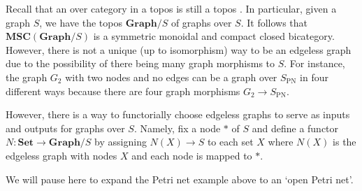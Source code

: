 \documentclass[11pt]{amsart}
\newcommand{\cat}[1]{\mathbf{#1}}
\newcommand{\from}{\colon}
\theoremstyle{remark}
\theoremstyle{definition}
\begin{document}
Recall that an over category in a topos is still a topos .  In particular, given a graph $S$, we have the topos $\cat{Graph}/S$ of graphs over $S$. It follows that $\cat{MSC}(\cat{Graph}/S)$ is a symmetric monoidal and compact closed bicategory. However, there is not a unique (up to isomorphism) way to be an edgeless graph due to the possibility of there being many graph morphisms to $S$. For instance, the graph $G_2$ with two nodes and no edges can be a graph over $S_{\text{PN}}$ in four different ways because there are four graph morphisms $G_2 \to S_{\text{PN}}$.

However, there is a way to functorially choose edgeless graphs to serve as inputs and outputs for graphs over $S$. Namely, fix a node $\ast$ of $S$ and define a functor $N \from \cat{Set} \to \cat{Graph}/S$ by assigning $N(X) \to S$ to each set $X$ where $N(X)$ is the edgeless graph with nodes $X$ and each node is mapped to $\ast$. 

We will pause here to expand the Petri net example above to an `open Petri net'.  
\end{document}
